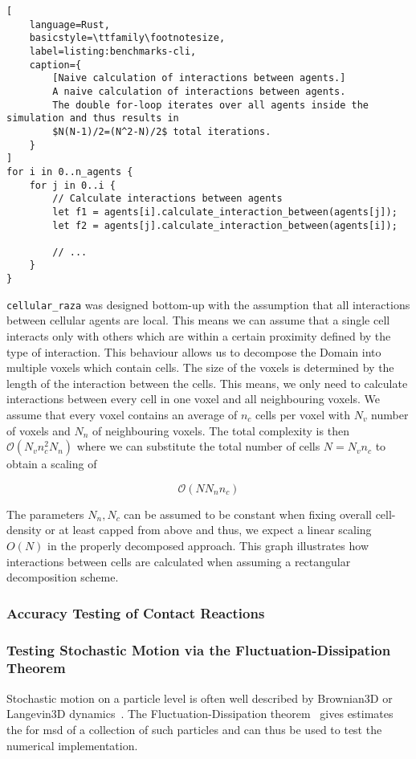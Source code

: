 \begin{minipage}{\linewidth}\begin{lstlisting}[
    language=Rust,
    basicstyle=\ttfamily\footnotesize,
    label=listing:benchmarks-cli,
    caption={
        [Naive calculation of interactions between agents.]
        A naive calculation of interactions between agents.
        The double for-loop iterates over all agents inside the simulation and thus results in
        $N(N-1)/2=(N^2-N)/2$ total iterations.
    }
]
for i in 0..n_agents {
    for j in 0..i {
        // Calculate interactions between agents
        let f1 = agents[i].calculate_interaction_between(agents[j]);
        let f2 = agents[j].calculate_interaction_between(agents[i]);

        // ...
    }
}
\end{lstlisting}\end{minipage}

\texttt{cellular\_raza} was designed bottom-up with the assumption that all interactions between
cellular agents are local.
This means we can assume that a single cell interacts only with others which are within a certain
proximity defined by the type of interaction.
This behaviour allows us to decompose the Domain into multiple voxels which contain cells.
The size of the voxels is determined by the length of the interaction between the cells.
This means, we only need to calculate interactions between every cell in one voxel and all
neighbouring voxels.
We assume that every voxel contains an average of $n_c$ cells per voxel with $N_v$ number
of voxels and $N_n$ of neighbouring voxels.
The total complexity is then $\mathcal{O}(N_vn_c^2N_n)$ where we can substitute the
total number of cells $N=N_vn_c$ to obtain a scaling of

\begin{equation}
    \mathcal{O}(NN_nn_c)
\end{equation}

The parameters $N_n,N_c$ can be assumed to be constant when fixing overall cell-density or at least
capped from above and thus, we expect a linear scaling $O(N)$ in the properly decomposed approach.
This graph illustrates how interactions between cells are calculated when assuming a rectangular decomposition scheme.

\subsubsection{Accuracy Testing of Contact Reactions}
\subsubsection{Testing Stochastic Motion via the Fluctuation-Dissipation Theorem}
Stochastic motion on a particle level is often well described by Brownian3D or Langevin3D
dynamics~\cite{Brown1828,Lemons1997}.
The Fluctuation-Dissipation theorem~\cite{Callen1951} gives estimates the for \ac{msd} of a
collection of such particles and can thus be used to test the numerical
implementation.

